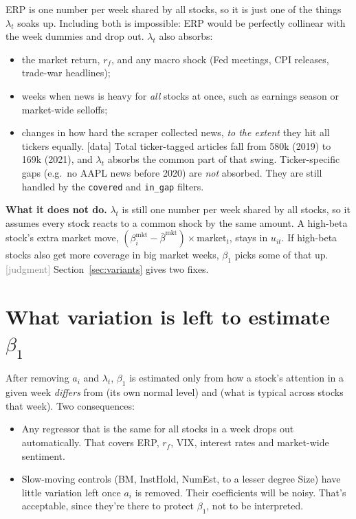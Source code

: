 \documentclass[11pt]{article}
\newcommand{\data}{\textcolor{NavyBlue}{\textsf{[data]}}}
\newcommand{\judg}{\textcolor{Gray}{\textsf{[judgment]}}}
\newcommand{\var}[1]{\texttt{#1}}
\begin{document}
ERP is one number per week shared by all stocks, so it is just one of the things $\lambda_t$ soaks up. Including both is impossible: ERP would be perfectly collinear with the week dummies and drop out. $\lambda_t$ also absorbs:
\begin{itemize}
  \item the market return, $r_f$, and any macro shock (Fed meetings, CPI releases, trade-war headlines);
  \item weeks when news is heavy for \emph{all} stocks at once, such as earnings season or market-wide selloffs;
  \item changes in how hard the scraper collected news, \emph{to the extent} they hit all tickers equally. \data{} Total ticker-tagged articles fall from 580k (2019) to 169k (2021), and $\lambda_t$ absorbs the common part of that swing. Ticker-specific gaps (e.g.\ no AAPL news before 2020) are \emph{not} absorbed. They are still handled by the \var{covered} and \var{in\_gap} filters.
\end{itemize}

\textbf{What it does not do.} $\lambda_t$ is still one number per week shared by all stocks, so it assumes every stock reacts to a common shock by the same amount. A high-beta stock's extra market move, $(\beta_i^{\text{mkt}} - \bar\beta^{\text{mkt}})\times\text{market}_t$, stays in $u_{it}$. If high-beta stocks also get more coverage in big market weeks, $\beta_1$ picks some of that up. \judg{} Section~\ref{sec:variants} gives two fixes.

\section{What variation is left to estimate $\beta_1$}

After removing $a_i$ and $\lambda_t$, $\beta_1$ is estimated only from how a stock's attention in a given week \emph{differs} from (its own normal level) and (what is typical across stocks that week). Two consequences:
\begin{itemize}
  \item Any regressor that is the same for all stocks in a week drops out automatically. That covers ERP, $r_f$, VIX, interest rates and market-wide sentiment.
  \item Slow-moving controls (BM, InstHold, NumEst, to a lesser degree Size) have little variation left once $a_i$ is removed. Their coefficients will be noisy. That's acceptable, since they're there to protect $\beta_1$, not to be interpreted.
\end{itemize}
\end{document}
